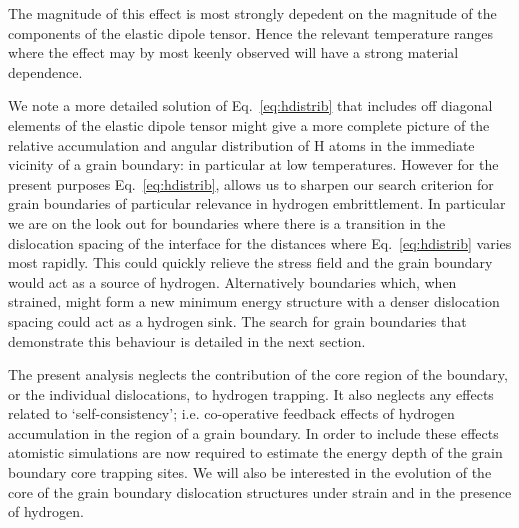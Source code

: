 \documentclass{article}
\begin{document}
The magnitude of this effect is most strongly depedent on the magnitude of
the components of the elastic dipole tensor. Hence the relevant temperature
ranges where the effect may by most keenly observed will have a strong material
dependence.

We note a more detailed solution of Eq.~\ref{eq:hdistrib} that includes off diagonal elements of
the elastic dipole tensor might give a more complete picture of the relative accumulation and
angular distribution of H atoms in the immediate vicinity of a grain boundary: in particular at low 
temperatures. However for the present purposes Eq.~\ref{eq:hdistrib}, allows us to sharpen
our search criterion for grain boundaries of particular relevance in hydrogen embrittlement.
In particular we are on the look out for boundaries where there is a transition in the 
dislocation spacing of the interface for the distances where Eq.~\ref{eq:hdistrib} varies most rapidly.
This could quickly relieve the stress field and the grain boundary would act
as a source of hydrogen. Alternatively boundaries which, when 
strained, might form a new minimum energy structure with a denser dislocation
spacing could act as a hydrogen sink. The search for
grain boundaries that demonstrate this behaviour is detailed in the next section.

The present analysis neglects the contribution of the core region of the boundary, or
the individual dislocations, to hydrogen trapping. It also 
neglects any effects related to `self-consistency'; i.e. 
co-operative feedback effects of hydrogen accumulation in the region
of a grain boundary. In order to include these effects atomistic simulations 
are now required to estimate the energy depth of the grain boundary core trapping sites.
We will also be interested in the evolution of the core of the grain boundary dislocation
structures under strain and in the presence of hydrogen. 
\end{document}
